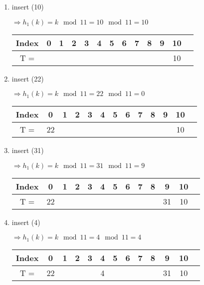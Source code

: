 \begin{enumerate}

\item insert (10)

$\Rightarrow h_1(k) = k \mod 11 = 10 \mod 11 = 10$ 
\begin{center}
\begin{tabular}{|c|c|c|c|c|c|c|c|c|c|c|c|c|}
\hline
Index & 0 & 1 & 2 & 3 & 4 & 5 & 6 & 7 & 8 & 9 & 10\\
\hline
T = & & & & & & & & & & & 10\\
\hline
\end{tabular}
\end{center}

\item insert (22)

$\Rightarrow h_1(k) = k \mod 11 = 22 \mod 11 = 0$ 
\begin{center}
\begin{tabular}{|c|c|c|c|c|c|c|c|c|c|c|c|c|}
\hline
Index & 0 & 1 & 2 & 3 & 4 & 5 & 6 & 7 & 8 & 9 & 10\\
\hline
T = & 22 & & & & & & & & & & 10\\
\hline
\end{tabular}
\end{center}

\item insert (31)

$\Rightarrow h_1(k) = k \mod 11 = 31 \mod 11 = 9$ 
\begin{center}
\begin{tabular}{|c|c|c|c|c|c|c|c|c|c|c|c|c|}
\hline
Index & 0 & 1 & 2 & 3 & 4 & 5 & 6 & 7 & 8 & 9 & 10\\
\hline
T = & 22 & & & & & & & & & 31 & 10\\
\hline
\end{tabular}
\end{center}

\item insert (4)

$\Rightarrow h_1(k) = k \mod 11 = 4 \mod 11 = 4$ 
\begin{center}
\begin{tabular}{|c|c|c|c|c|c|c|c|c|c|c|c|c|}
\hline
Index & 0 & 1 & 2 & 3 & 4 & 5 & 6 & 7 & 8 & 9 & 10\\
\hline
T = & 22 &  &  &  & 4 &  &  &  &  & 31 & 10\\
\hline
\end{tabular}
\end{center}


\end{enumerate}
